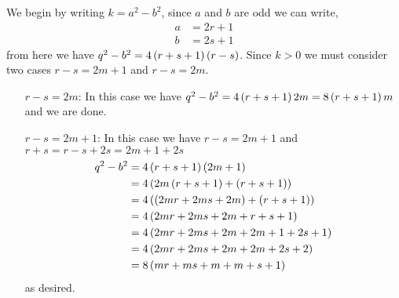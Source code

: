 \begin{mdframed}[style=darkAnswer,frametitle={Joe Starr}]

  We begin by writing $k=a^2-b^2$, since $a$ and $b$ are odd we can write,
  \begin{align*}
    a & =2r+1 \\
    b & =2s+1
  \end{align*}
  from here we have $q^2-b^2=4\left(r+s+1\right)\left(r-s\right)$. Since $k>0$ we must consider
  two cases $r-s=2m+1$ and $r-s=2m$.
  \begin{itemize}[align=left]
    \item [$r-s=2m$:]{\hspace{.5in}\newline
          In this case we have $q^2-b^2=4\left(r+s+1\right)2m=8\left(r+s+1\right)m$ and we are
          done.
          }
    \item [$r-s=2m+1$:]{\hspace{.5in}\newline
          In this case we have $r-s=2m+1$ and $r+s=r-s+2s=2m+1+2s$
          \begin{align*}
            q^2-b^2 & =4\left(r+s+1\right)\left(2m+1\right)              \\
                    & =4\left(2m\left(r+s+1\right)+\left(r+s+1\right)\right)    \\
                    & =4\left(\left(2mr+2ms+2m\right)+\left(r+s+1\right)\right) \\
                    & =4\left(2mr+2ms+2m+r+s+1\right)             \\
                    & =4\left(2mr+2ms+2m+2m+1+2s+1\right)         \\
                    & =4\left(2mr+2ms+2m+2m+2s+2\right)           \\
                    & =8\left(mr+ms+m+m+s+1\right)                \\
          \end{align*}
          as desired.
          }
  \end{itemize}

\end{mdframed}
\newpage
